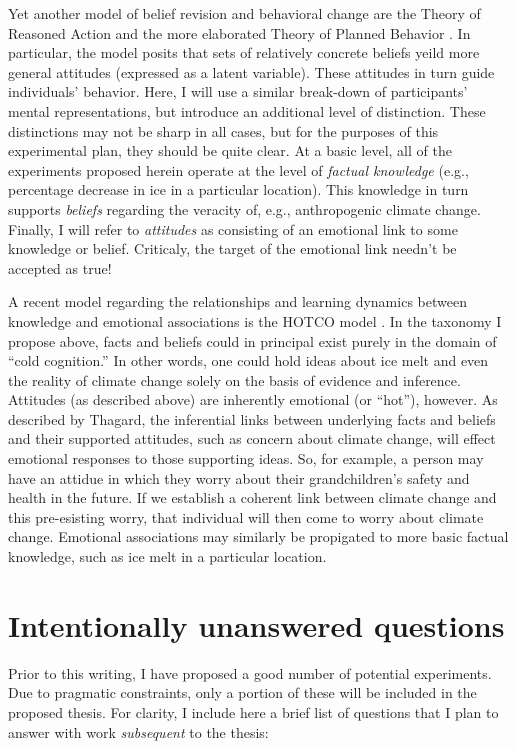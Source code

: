 Yet another model of belief revision and behavioral change are the Theory of
Reasoned Action and the more elaborated Theory of Planned Behavior
\cite{montano_theory_2008}. In particular, the model posits that sets of
relatively concrete beliefs yeild more general attitudes (expressed as a latent
variable). These attitudes in turn guide individuals' behavior.  Here, I will
use a similar break-down of participants' mental representations, but introduce
an additional level of distinction. These distinctions may not be sharp in all
cases, but for the purposes of this experimental plan, they should be quite
clear. At a basic level, all of the experiments proposed herein operate at the
level of \emph{factual knowledge} (e.g., percentage decrease in ice in a
particular location). This knowledge in turn supports \emph{beliefs} regarding
the veracity of, e.g., anthropogenic climate change. Finally, I will refer to
\emph{attitudes} as consisting of an emotional link to some knowledge or belief.
Criticaly, the target of the emotional link needn't be accepted as true!

A recent model regarding the relationships and learning dynamics between
knowledge and emotional associations is the HOTCO model \cite{thagard_hot_2006}.
In the taxonomy I propose above, facts and beliefs could in principal exist
purely in the domain of ``cold cognition.'' In other words, one could hold ideas
about ice melt and even the reality of climate change solely on the basis of
evidence and inference.  Attitudes (as described above) are inherently emotional
(or ``hot''), however. As described by Thagard, the inferential links between
underlying facts and beliefs and their supported attitudes, such as concern
about climate change, will effect emotional responses to those supporting ideas.
So, for example, a person may have an attidue in which they worry about their
grandchildren's safety and health in the future. If we establish a coherent link
between climate change and this pre-esisting worry, that individual will then
come to worry about climate change. Emotional associations may similarly be
propigated to more basic factual knowledge, such as ice melt in a particular
location.

\section{Intentionally unanswered questions}

Prior to this writing, I have proposed a good number of potential experiments.
Due to pragmatic constraints, only a portion of these will be included in the
proposed thesis. For clarity, I include here a brief list of questions that I
plan to answer with work \emph{subsequent} to the thesis:

